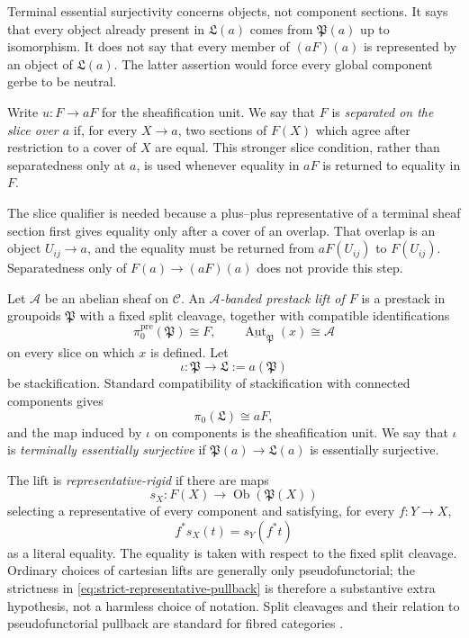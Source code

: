 Terminal essential surjectivity concerns objects, not component sections.
It says that every object already present in \(\mathfrak L(a)\) comes from
\(\mathfrak P(a)\) up to isomorphism.  It does not say that every member of
\((aF)(a)\) is represented by an object of \(\mathfrak L(a)\).  The latter
assertion would force every global component gerbe to be neutral.

Write \(u:F\to aF\) for the sheafification unit.  We say that \(F\) is
\emph{separated on the slice over \(a\)} if, for every \(X\to a\), two
sections of \(F(X)\) which agree after restriction to a cover of \(X\) are
equal.  This stronger slice condition, rather than separatedness only at
\(a\), is used whenever equality in \(aF\) is returned to equality in
\(F\).

The slice qualifier is needed because a plus--plus representative of a
terminal sheaf section first gives equality only after a cover of an overlap.
That overlap is an object \(U_{ij}\to a\), and the equality must be returned
from \(aF(U_{ij})\) to \(F(U_{ij})\).  Separatedness only of
\(F(a)\to(aF)(a)\) does not provide this step.

Let \(\mathscr A\) be an abelian sheaf on \(\mathcal C\).  An
\emph{\(\mathscr A\)-banded prestack lift of \(F\)} is a prestack in
groupoids \(\mathfrak P\) with a fixed split cleavage, together with
compatible identifications
\[
 \pi_0^{\mathrm{pre}}(\mathfrak P)\cong F,
 \qquad
 \underline{\operatorname{Aut}}_{\mathfrak P}(x)\cong\mathscr A
\]
on every slice on which \(x\) is defined.  Let
\[
 \iota:\mathfrak P\longrightarrow\mathfrak L:=a(\mathfrak P)
\]
be stackification.  Standard compatibility of stackification with connected
components gives
\begin{equation}\label{eq:stackification-components-core}
 \pi_0(\mathfrak L)\cong aF,
\end{equation}
and the map induced by \(\iota\) on components is the sheafification unit.
We say that \(\iota\) is \emph{terminally essentially surjective} if
\(\mathfrak P(a)\to\mathfrak L(a)\) is essentially surjective.

The lift is \emph{representative-rigid} if there are maps
\[
 s_X:F(X)\longrightarrow\operatorname{Ob}(\mathfrak P(X))
\]
selecting a representative of every component and satisfying, for every
\(f:Y\to X\),
\begin{equation}\label{eq:strict-representative-pullback}
 f^*s_X(t)=s_Y(f^*t)
\end{equation}
as a literal equality.  The equality is taken with respect to the fixed
split cleavage.  Ordinary choices of cartesian lifts are generally only
pseudofunctorial; the strictness in
\eqref{eq:strict-representative-pullback} is therefore a substantive extra
hypothesis, not a harmless choice of notation.  Split cleavages and their
relation to pseudofunctorial pullback are standard for fibred categories
\cite[Chap.~VI]{MacLaneMoerdijk1994}.

